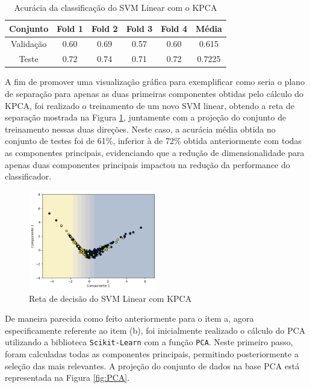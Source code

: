 \documentclass[]{abntex2}
\begin{document}
\begin{table}[H]
    \centering
    \begin{tabular}{|c|c|c|c|c|c|}
    \hline
    \rowcolor[HTML]{C0C0C0} 
    Conjunto                          & Fold 1 & Fold 2 & Fold 3 & Fold 4 & Média  \\ \hline
    \cellcolor[HTML]{C0C0C0}Validação & 0.60   & 0.69   & 0.57   & 0.60   & 0.615  \\ \hline
    \cellcolor[HTML]{C0C0C0}Teste     & 0.72   & 0.74   & 0.71   & 0.72   & 0.7225 \\ \hline
    \end{tabular}
    \caption{Acurácia da classificação do SVM Linear com o KPCA}
    \label{tab:kpca_svm}
\end{table}

A fim de promover uma visualização gráfica para exemplificar como seria o plano de separação para apenas as duas primeiras componentes obtidas pelo cálculo do KPCA, foi realizado o treinamento de um novo SVM linear, obtendo a reta de separação mostrada na Figura \ref{fig:kpca_reta}, juntamente com a projeção do conjunto de treinamento nessas duas direções. Neste caso, a acurácia média obtida no conjunto de testes foi de 61\%, inferior à de 72\% obtida anteriormente com todas as componentes principais, evidenciando que a redução de dimensionalidade para apenas duas componentes principais impactou na redução da performance do classificador.

\begin{figure}
    \centering 
    \includegraphics[width=0.5\textwidth]{imgs/ex1/kpca_reta.png}
    \caption{Reta de decisão do SVM Linear com KPCA}
    \label{fig:kpca_reta} %
\end{figure}

\newpage

De maneira parecida como feito anteriormente para o item a, agora especificamente referente ao item (b), foi inicialmente realizado o cálculo do PCA utilizando a biblioteca \texttt{Scikit-Learn} com a função \texttt{PCA}. Neste primeiro passo, foram calculadas todas as componentes principais, permitindo posteriormente a seleção das mais relevantes. A projeção do conjunto de dados na base PCA está representada na Figura \ref{fig:PCA}.
\end{document}
